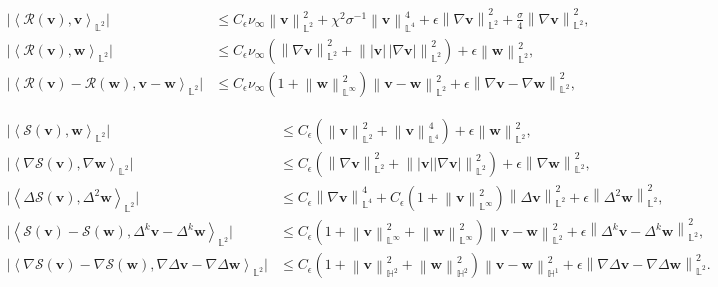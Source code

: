 \documentclass[10pt,a4paper]{amsart}
\newcommand{\bb}{\mathbb}
\newcommand{\bff}{\boldsymbol}
\newcommand{\inpro}[2]{\left\langle#1,#2\right\rangle}
\newcommand{\norm}[2]{\left\|{#1}\right\|_{#2}}
\begin{document}
	\begin{align}
        \label{equ:Rv v L2}
        \big| \inpro{\mathcal{R}(\bff{v})}{\bff{v}}_{\bb{L}^2} \big|
        &\leq
        C_\epsilon \nu_\infty \norm{\bff{v}}{\bb{L}^2}^2
        +
        \chi^2 \sigma^{-1} \norm{\bff{v}}{\bb{L}^4}^4
        +
        \epsilon \norm{\nabla \bff{v}}{\bb{L}^2}^2
		+
		\frac{\sigma}{4} \norm{\nabla \bff{v}}{\bb{L}^2}^2,
        \\
		\label{equ:Rv w}
		\big| \inpro{\mathcal{R}(\bff{v})}{\bff{w}}_{\bb{L}^2} \big|
		&\leq
		C_\epsilon \nu_\infty
		\left( \norm{\nabla \bff{v}}{\bb{L}^2}^2
		+
		\norm{|\bff{v}|\, |\nabla \bff{v}|}{\bb{L}^2}^2 \right)
		+
		\epsilon \norm{\bff{w}}{\bb{L}^2}^2,
		\\
		\label{equ:Rvw vw}
		\big| \inpro{\mathcal{R}(\bff{v})-\mathcal{R}(\bff{w})}{\bff{v}-\bff{w}}_{\bb{L}^2} \big|
		&\leq
		C_\epsilon \nu_\infty \left(1+\norm{\bff{w}}{\bb{L}^\infty}^2 \right)
		\norm{\bff{v}-\bff{w}}{\bb{L}^2}^2
		+
		\epsilon \norm{\nabla \bff{v}-\nabla \bff{w}}{\bb{L}^2}^2,
	\end{align}

\begin{align}
	\label{equ:Sv w}
	\big| \inpro{\mathcal{S}(\bff{v})}{\bff{w}}_{\bb{L}^2} \big|
	&\leq
	C_\epsilon \left(\norm{\bff{v}}{\bb{L}^2}^2 +\norm{\bff{v}}{\bb{L}^4}^4\right) + \epsilon \norm{\bff{w}}{\bb{L}^2}^2,
	\\
	\label{equ:nab Sv nab w}
	\big| \inpro{\nabla \mathcal{S}(\bff{v})}{\nabla \bff{w}}_{\bb{L}^2} \big|
	&\leq
	C_\epsilon \left(\norm{\nabla \bff{v}}{\bb{L}^2}^2 +\norm{|\bff{v}| |\nabla\bff{v}|}{\bb{L}^2}^2\right) + \epsilon \norm{\nabla \bff{w}}{\bb{L}^2}^2,
	\\
	\label{equ:Sv Delta2 w}
	\big| \inpro{\Delta \mathcal{S}(\bff{v})}{\Delta^2 \bff{w}}_{\bb{L}^2} \big| 
	&\leq
	C_\epsilon \norm{\nabla \bff{v}}{\bb{L}^4}^4 + C_\epsilon \left(1+\norm{\bff{v}}{\bb{L}^\infty}^2 \right) \norm{\Delta \bff{v}}{\bb{L}^2}^2
	+
	\epsilon \norm{\Delta^2 \bff{w}}{\bb{L}^2}^2,
	\\
	\label{equ:Sv Sw v min w}
	\Big| \inpro{\mathcal{S}(\bff{v})-\mathcal{S}(\bff{w})}{\Delta^k \bff{v}- \Delta^k \bff{w}}_{\bb{L}^2} \Big|
	&\leq
	C_\epsilon \left(1+\norm{\bff{v}}{\bb{L}^\infty}^2 + \norm{\bff{w}}{\bb{L}^\infty}^2 \right) \norm{\bff{v}-\bff{w}}{\bb{L}^2}^2 
	+
	\epsilon \norm{\Delta^k \bff{v}- \Delta^k \bff{w}}{\bb{L}^2}^2,
	\\
	\label{equ:nab Sv Sw nab vw}
	\Big| \inpro{\nabla \mathcal{S}(\bff{v})- \nabla \mathcal{S}(\bff{w})}{\nabla \Delta \bff{v}- \nabla \Delta \bff{w}}_{\bb{L}^2} \Big|
	&\leq
	C_\epsilon \left(1+ \norm{\bff{v}}{\bb{H}^2}^2 + \norm{\bff{w}}{\bb{H}^2}^2 \right) \norm{\bff{v}-\bff{w}}{\bb{H}^1}^2
	+
	\epsilon \norm{\nabla\Delta \bff{v}- \nabla \Delta \bff{w}}{\bb{L}^2}^2.
\end{align}
\end{document}
